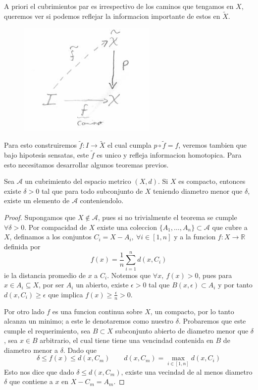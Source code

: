 A priori el cubrimientos par es irrespectivo de los caminos que tengamos
en \(X\), queremos ver si podemos reflejar la informacion importante de
estos en \(\tilde{X}\).
\begin{figure}[h]
  \centering
  \includegraphics[scale=0.5]{./imagenes/lifting-path-diagrama.png}
\end{figure}
Para esto construiremos \(\tilde f : I \to \tilde X\) el cual cumpla \(p
\circ \tilde f = f \), veremos tambien que bajo hipotesis sensatas, este
\(\tilde f\) es unico y refleja informacion homotopica. Para esto
necesitamos desarrollar algunos teoremas previos.
\begin{lema} \label{thm:lebesgue-number-lema}
  Sea \(\mathcal A\) un cubrimiento del espacio metrico \((X,d)\). Si
  \(X\) es compacto, entonces existe \(\delta > 0\) tal que para todo
  subconjunto de \(X\) teniendo diametro menor que \(\delta\), existe un
  elemento de \(\mathcal A\) conteniendolo.
\end{lema}
\begin{proof}
  Supongamos que \(X \not \in \mathcal A\), pues si no trivialmente el
  teorema se cumple \(\forall \delta > 0\). Por compacidad de \(X\)
  existe una coleccion \(\{A_1,\dotsc,A_n\} \subset \mathcal A\) que
  cubre a \(X\), definamos a los conjuntos \(C_i = X - A_i,\ \forall i
  \in [1,n]\) y a la funcion \(f : X \to \mathbb R\) definida por
  \[ f(x) = \frac 1 n \sum_{i=1}^{n} d(x, C_i) \]
  ie la distancia promedio de \(x\) a \(C_i\). Notemos que \(\forall x,\
  f(x) > 0\), pues para \(x \in A_i \subseteq X\), por ser \(A_i\) un
  abierto, existe \(\epsilon > 0\) tal que \(B(x,\epsilon) \subset A_i\)
  y por tanto \(d(x, C_i) \geq \epsilon\) que implica  \( f(x) \geq \frac
  \epsilon n > 0\).

  Por otro lado \(f\) es una funcion continua sobre \(X\), un compacto,
  por lo tanto alcanza un minimo; a este le denotaremos como nuestro
  \(\delta\). Probaremos que este cumple el requerimiento, sea \(B
  \subset X\) subconjunto abierto de diametro menor que \(\delta\), sea
  \(x \in B\) arbitrario, el cual tiene tiene una vencindad contenida en
  \(B\) de diametro menor a \(\delta\). Dado que
  \[\delta \leq f(x) \leq d(x, C_m)
      \qquad d(x, C_m) = \max_{i \in [1,n]} d(x, C_i)\]
  Esto nos dice que dado \(\delta \leq d(x, C_m)\), existe una vecindad
  de al menos diametro \(\delta\) que contiene a \(x\) en \(X - C_m = A_m\).
\end{proof}
